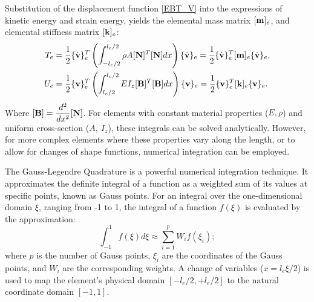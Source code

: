Substitution of the displacement function \ref{EBT_V} into the expressions of kinetic energy and strain energy, yields the elemental mass matrix $[\mathbf{m}]_e$, and elemental stiffness matrix $[\mathbf{k}]_e$:
\begin{align}
    T_e &= \frac{1}{2} \{\dot{\mathbf{v}}\}_e^T \left( \int_{-l_e/2}^{l_e/2} \rho A [\mathbf{N}]^T [\mathbf{N}] dx \right) \{\dot{\mathbf{v}}\}_e = \frac{1}{2} \{\dot{\mathbf{v}}\}_e^T [\mathbf{m}]_e \{\dot{\mathbf{v}}\}_e, \\
    U_e &= \frac{1}{2} \{\mathbf{v}\}_e^T \left( \int_{l_e/2}^{l_e/2} EI_z [\mathbf{B}]^T [\mathbf{B}] dx \right) \{\mathbf{v}\}_e = \frac{1}{2} \{\mathbf{v}\}_e^T [\mathbf{k}]_e \{\mathbf{v}\}_e.
\end{align}
Where $[\mathbf{B}] = \dfrac{d^2}{dx^2}[\mathbf{N}]$. For elements with constant material properties ($E, \rho$) and uniform cross-section ($A,\: I_z$), these integrals can be solved analytically. However, for more complex elements where these properties vary along the length, or to allow for changes of shape functions, numerical integration can be employed.

The Gauss-Legendre Quadrature is a powerful numerical integration technique. It approximates the definite integral of a function as a weighted sum of its values at specific points, known as Gauss points. For an integral over the one-dimensional domain $\xi$, ranging from -1 to 1, the integral of a function $f(\xi)$ is evaluated by the approximation:
\begin{equation}
    \int_{-1}^{1} f(\xi) d\xi \approx \sum_{i=1}^{p} W_i f(\xi_i);
\end{equation}
where $p$ is the number of Gauss points, $\xi_i$ are the coordinates of the Gauss points, and $W_i$ are the corresponding weights. A change of variables ($x = l_e\xi/2$) is used to map the element's physical domain $[-l_e/2, +l_e/2]$ to the natural coordinate domain $[-1, 1]$.

